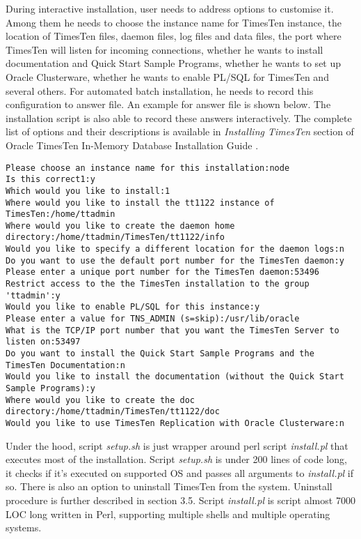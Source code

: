\documentclass[11pt, letterpaper]{article}
\begin{document}
During interactive installation, user needs to address options to customise it. Among them he needs to choose the instance name for TimesTen instance, the location of TimesTen files, daemon files, log files and data files, the port where TimesTen will listen for incoming connections, whether he wants to install documentation and Quick Start Sample Programs, whether he wants to set up Oracle Clusterware, whether he wants to enable PL/SQL for TimesTen and several others. For automated batch installation, he needs to record this configuration to answer file. An example for answer file is shown below. The installation script is also able to record these answers interactively. The complete list of options and their descriptions is available in \emph{Installing TimesTen} section of Oracle TimesTen In-Memory Database Installation Guide \cite{ref_install_op}.

\lstset{basicstyle=\ttfamily\scriptsize}
\begin{lstlisting}
Please choose an instance name for this installation:node
Is this correct1:y
Which would you like to install:1
Where would you like to install the tt1122 instance of TimesTen:/home/ttadmin
Where would you like to create the daemon home directory:/home/ttadmin/TimesTen/tt1122/info
Would you like to specify a different location for the daemon logs:n
Do you want to use the default port number for the TimesTen daemon:y
Please enter a unique port number for the TimesTen daemon:53496
Restrict access to the the TimesTen installation to the group 'ttadmin':y
Would you like to enable PL/SQL for this instance:y
Please enter a value for TNS_ADMIN (s=skip):/usr/lib/oracle
What is the TCP/IP port number that you want the TimesTen Server to listen on:53497
Do you want to install the Quick Start Sample Programs and the TimesTen Documentation:n
Would you like to install the documentation (without the Quick Start Sample Programs):y
Where would you like to create the doc directory:/home/ttadmin/TimesTen/tt1122/doc
Would you like to use TimesTen Replication with Oracle Clusterware:n
\end{lstlisting}

Under the hood, script \emph{setup.sh} is just wrapper around perl script \emph{install.pl} that executes most of the installation. Script \emph{setup.sh} is under 200 lines of code long, it checks if it’s executed on supported OS and passes all arguments to \emph{install.pl} if so. There is also an option to uninstall TimesTen from the system. Uninstall procedure is further described in section 3.5. Script \emph{install.pl} is script almost 7000 LOC long written in Perl, supporting multiple shells and multiple operating systems.
\end{document}
